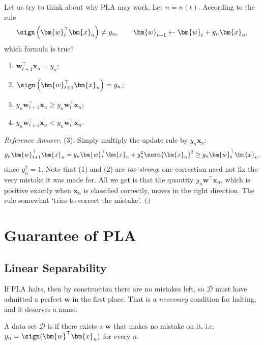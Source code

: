 \begin{exercise}
    Let us try to think about why PLA may work. Let \(n = n(t)\). According to
    the rule
    \[
        \sign \left( \bm{w}_t^\top \bm{x}_n \right) \neq y_n, \qquad
        \bm{w}_{t+1} \gets \bm{w}_t + y_n \bm{x}_n,
    \]
    which formula is true?
    \begin{enumerate}[(1)]
        \item \(\bm{w}_{t+1}^\top \bm{x}_n = y_n\);
        \item \(\sign \left( \bm{w}_{t+1}^\top \bm{x}_n \right) = y_n\);
        \item \(y_n \bm{w}_{t+1}^\top \bm{x}_n \ge y_n \bm{w}_t^\top \bm{x}_n\);
        \item \(y_n \bm{w}_{t+1}^\top \bm{x}_n < y_n \bm{w}_t^\top \bm{x}_n\).
    \end{enumerate}
\end{exercise}

\begin{proof}[Reference Answer]
    (3). Simply multiply the update rule by \(y_n \bm{x}_n\):
    \[
        y_n \bm{w}_{t+1}^\top \bm{x}_n
        = y_n \bm{w}_t^\top \bm{x}_n + y_n^2 \norm{\bm{x}_n}^2
        \ge y_n \bm{w}_t^\top \bm{x}_n,
    \]
    since \(y_n^2 = 1\). Note that (1) and (2) are \emph{too strong}: one
    correction need not fix the very mistake it was made for. All we get is that
    the quantity \(y_n \bm{w}^\top \bm{x}_n\), which is positive exactly when
    \(\bm{x}_n\) is classified correctly, moves in the right direction. The rule
    somewhat `tries to correct the mistake'.
\end{proof}

\section{Guarantee of PLA}\label{sec:pla-guarantee}


\subsection{Linear Separability}

If PLA halts, then by construction there are no mistakes left, so
\(\mathcal{D}\) must have admitted a perfect \(\bm{w}\) in the first place. That
is a \emph{necessary} condition for halting, and it deserves a name.

\begin{definition}\label{def:sep}
    A data set \(\mathcal{D}\) is  if there exists a
    \(\bm{w}\) that makes no mistake on it, i.e.\
    \(y_n = \sign(\bm{w}^\top \bm{x}_n)\) for every \(n\).
\end{definition}

